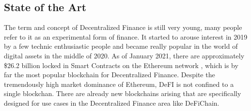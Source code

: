 \subsection{State of the Art}
The term and concept of Decentralized Finance is still very young, many people refer to it as an experimental form of finance. It started to arouse interest in 2019
by a few technic enthusiastic people and became really popular in the world of digital assets in the middle of 2020. As of January 2021, there are approximately
\$26.2 billion locked in Smart Contracts on the Ethereum network \cite{DeFiPulse}, which is by far the most popular blockchain for Decentralized Finance. Despite the
tremendously high market dominance of Ethereum, DeFI is not confined to a single blockchan. There are already new blockchains arising that are specifically designed
for use cases in the Decentralized Finance area like DeFiChain\cite{DeFiChain}.